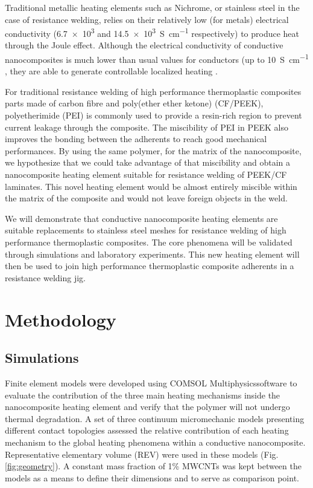 \documentclass[11pt,review,times]{elsarticle}
\begin{document}
Traditional metallic heating elements such as Nichrome, or stainless steel in the case of resistance welding, relies on their relatively low (for metals) electrical conductivity (\num{6.7e3} and \SI{14.5e3}{\siemens\per\centi\metre} respectively) to produce heat through the Joule effect. 
Although the electrical conductivity of conductive nanocomposites is much lower than usual values for conductors (up to \SI{10}{\siemens\per\centi\metre} \cite{Grossiord2008a}, they are able to generate controllable localized heating \cite{Pyo2016}. 

For traditional resistance welding of high performance thermoplastic composites parts made of carbon fibre and poly(ether ether ketone) (CF/PEEK), polyetherimide (PEI) is commonly used to provide a resin-rich region to prevent current leakage through the composite. 
The miscibility of PEI in PEEK \cite{Crevecoeur1991} also improves the bonding between the adherents to reach good mechanical performances. 
By using the same polymer, for the matrix of the nanocomposite, we hypothesize that we could take advantage of that miscibility and obtain a nanocomposite heating element suitable for resistance welding of PEEK/CF laminates. 
This novel heating element would be almost entirely miscible within the matrix of the composite and would not leave foreign objects in the weld. 

We will demonstrate that conductive nanocomposite heating elements are suitable replacements to stainless steel meshes for resistance welding of high performance thermoplastic composites. The core phenomena will be validated through simulations and laboratory experiments. This new heating element will then be used to join high performance thermoplastic composite adherents in a resistance welding jig.  


							\section{Methodology}

\subsection{Simulations}

Finite element models were developed using COMSOL Mul\-ti\-phy\-sics\-\textregistered software to evaluate the contribution of the three main heating mechanisms inside the nanocomposite heating element and verify that the polymer will not undergo thermal degradation.  
A set of three continuum micromechanic models presenting different contact topologies assessed the relative contribution of each heating mechanism to the global heating phenomena within a conductive nanocomposite. 
Representative elementary volume (REV) were used in these models (Fig. \ref{fig:geometry}). 
A constant mass fraction of 1\% MWCNTs was kept between the models as a means to define their dimensions and to serve as comparison point. 
\end{document}
